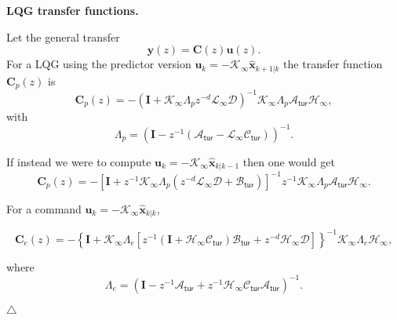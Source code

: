 \documentclass[a4paper,12pt]{article}
\newcommand{\0}{\mathsf{0}} %
\newcommand{\I}{\mathbf{I}} %
\newcommand{\Hkal}{\mathcal{H}_{\infty}} %
\newcommand{\Lkal}{\mathcal{L}_{\infty}} %
\newcommand{\K}{\mathcal{K}_{\infty}} %
\newcommand{\z}{{z}} %
\newcommand{\propend}{\hfill \ensuremath{\bigtriangleup}}
\newcommand{\Ad}{\mathcal{A}_\mathsf{tur}} %
\newcommand{\Bd}{\mathcal{B}_\mathsf{tur}} %
\newcommand{\Cd}{\mathcal{C}_\mathsf{tur}} %
\newcommand{\xvec}{{\mathbf{x}}}
\newcommand{\uvec}{{\mathbf{u}}}
\begin{document}
       \begin{property} \textbf{LQG transfer functions.}
   
     Let the general transfer
          \begin{equation}
            \mathbf{y}(\z) = \mathbf{C}(\z) \mathbf{u}(\z).
          \end{equation}
          For a LQG using the predictor version $\uvec_k =
          -\K \widehat{\xvec}_{k+1|k}$
          the transfer function $\mathbf{C}_p(\z)$
          is
          \begin{equation}
            \label{eq:Kalman_predictor_TF}
            \mathbf{C}_p(\z)  =
            - \left( \I + \K \Lambda_{p} \z^{-d} \Lkal \mathcal{D} \right)^{-1} \K 
            \Lambda_{p} \Ad \Hkal,
          \end{equation}
          with 
           \begin{equation}
            \Lambda_{p} = \left(\I - \z^{-1} \left( \Ad -  \Lkal \Cd
              \right)\right)^{-1}.
          \end{equation}
         
If instead we were to compute   $\uvec_k = -\K \widehat{\xvec}_{k|k-1}$ then
one would get
  \begin{equation}
    \mathbf{C}_p(\z) =  - \left[ \I + z^{-1}\K \Lambda_{p} \left(\z^{-d} \Lkal
      \mathcal{D} + \Bd \right)\right]^{-1} z^{-1}\K
            \Lambda_{p} \Ad \Hkal  .
  \end{equation}

  For a command $\uvec_k = -\K
  \widehat{\xvec}_{k|k}$,

 \begin{equation}
    \mathbf{C}_e(\z)  = - \left\{\I + \K \Lambda_{e} \left[z^{-1}
        (\I+\Hkal\Cd) \Bd + \z^{-d}\Hkal\mathcal{D}\right] \right\}^{-1} \K \Lambda_{e} \Hkal,
  \end{equation}

where 
  \begin{equation}
    \Lambda_{e} = \left(\I - \z^{-1}\Ad + \z^{-1} \Hkal \Cd \Ad \right)^{-1}.
  \end{equation}

\propend
        \end{property}
\end{document}
